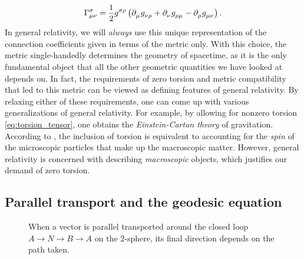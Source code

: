 \begin{equation}
	\Gamma^\sigma_{\mu \nu} = \frac{1}{2} g\indices{^\sigma^\rho} \left(
		\partial\indices{_\mu} g\indices{_\nu_\rho} +
		\partial\indices{_\nu} g\indices{_\rho_\mu} -
		\partial\indices{_\rho} g\indices{_\mu_\nu}
	\right) .
	\label{eq:def_christoffel}
\end{equation}
In general relativity, we will \emph{always} use this unique representation of the connection coefficients given in terms of the metric only.
With this choice, the metric single-handedly determines the geometry of spacetime, as it is the only fundamental object that all the other geometric quantities we have looked at depends on.
In fact, the requirements of zero torsion and metric compatibility that led to this metric can be viewed as defining features of general relativity.
By relaxing either of these requirements, one can come up with various generalizations of general relativity.
For example, by allowing for nonzero torsion \eqref{eq:torsion_tensor}, one obtains the \emph{Einstein-Cartan theory} of gravitation.
According to \cite{ref:hehl}, the inclusion of torsion is equivalent to accounting for the \emph{spin} of the microscopic particles that make up the macroscopic matter.
However, general relativity is concerned with describing \emph{macroscopic} objects, which justifies our demand of zero torsion.

\iffalse
\begin{align}
	\nabla_c T\indices{^{a_1 \ldots a_r}_{b_1 \ldots b_s}} &= \partial_c {T^{a_1 \ldots a_r}}_{b_1 \ldots b_s} \\
	                                                       &+ \Gamma^{a_1}_{dc} T\indices{^{d a_2 \ldots a_r}_{b_1 \ldots b_s}} + \dots + \Gamma^{a_r}_{dc} T\indices{^{a_1 \ldots a_{r-1}d}_{b_1 \ldots b_s}} \\
	                                                       &- {\Gamma^d}_{b_1 c} {T^{a_1 \ldots a_r}}_{d b_2 \ldots b_s} - \cdots - {\Gamma^d}_{b_s c} {T^{a_1 \ldots a_r}}_{b_1 \ldots b_{s-1} d}.
	\label{eq:def_cov_deriv}
\end{align}
\fi

\subsection{Parallel transport and the geodesic equation}
\label{sec:geodesic}

\begin{figure}
\centering

\caption{\label{fig:parallel_transport}%
	When a vector is parallel transported around the closed loop $A \rightarrow N \rightarrow B \rightarrow A$ on the $2$-sphere, its final direction depends on the path taken.
}
\end{figure}

